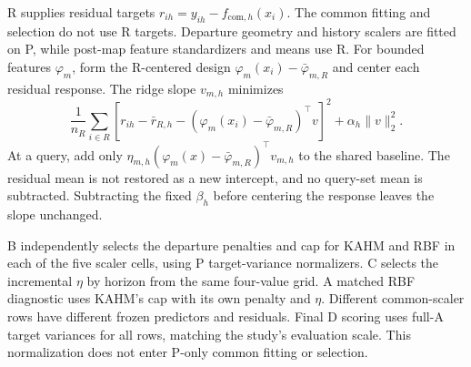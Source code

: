 R supplies residual targets $r_{ih}=y_{ih}-f_{\mathrm{com},h}(x_i)$.
The common fitting and selection do not use R targets. Departure geometry
and history scalers are fitted on P, while post-map feature standardizers
and means use R. For bounded features $\varphi_m$, form the R-centered
design $\varphi_m(x_i)-\bar\varphi_{m,R}$ and center each residual response.
The ridge slope $v_{m,h}$ minimizes
\begin{equation}
 \frac1{n_R}\sum_{i\in R}
 \left[r_{ih}-\bar r_{R,h}
       -(\varphi_m(x_i)-\bar\varphi_{m,R})^\top v\right]^2
 +\alpha_h\|v\|_2^2.
 \label{eq:supp-followup-centered-head}
\end{equation}
At a query, add only
$\eta_{m,h}(\varphi_m(x)-\bar\varphi_{m,R})^\top v_{m,h}$
to the shared baseline. The residual mean is not restored as a new
intercept, and no query-set mean is subtracted. Subtracting the fixed
$\beta_h$ before centering the response leaves the slope unchanged.

B independently selects the departure penalties and cap for KAHM and
RBF in each of the five scaler cells, using P target-variance normalizers.
C selects the incremental $\eta$ by horizon from the same four-value grid.
A matched RBF diagnostic uses KAHM's cap with its own penalty and $\eta$.
Different common-scaler rows have different frozen predictors and residuals.
Final D scoring uses full-A target variances for all rows, matching the
study's evaluation scale. This normalization does not enter P-only common
fitting or selection.

\begin{table}[t]
\centering\small
\caption{All prescribed nonlinear P/R fixed-common scaler cells. KAHM
and independently selected RBF share their row's exact common predictor
and B bias. Every entry is a secondary descriptive result.}
\label{tab:supp-pp-fixed}

\end{table}

\begin{table}[t]
\centering\small
\caption{KAHM minus independently selected RBF in the same five P/R
cells. Intervals are unadjusted two-sided 95\% paired-$t$ intervals;
``wins'' count lower KAHM loss among \PPRepetitions\ repetition aggregates.
These are neither an additional simultaneous family nor a rule for
selecting a scaler after observing D.}
\label{tab:supp-pp-fixed-intervals}

\end{table}

